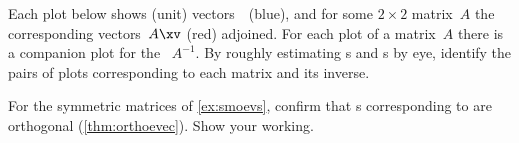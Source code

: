 \begin{exercise}  
Each plot below shows (unit) vectors~\xv\ (blue), and for some \(2\times 2\) matrix~\(A\) the corresponding vectors~\(A\xv\) (red) adjoined. 
For each plot of a matrix~\(A\) there is a companion plot for the ~\(A^{-1}\).
By roughly estimating s and s by eye, identify the pairs of plots corresponding to each matrix and its inverse.
\begin{Parts}
\item\label{ex:epria} 
\item\label{ex:eprib} 
\item\label{ex:epric} 
\item\label{ex:eprid} 
\begin{reduce}
\item\label{ex:eprie} 
\item\label{ex:eprif} 
\item\label{ex:eprig} 
\end{reduce}
\item\label{ex:eprih} 
\item\label{ex:eprii} 
\begin{reduce}
\item\label{ex:eprij} 
\end{reduce}
\end{Parts}
\end{exercise}





\begin{exercise}  
For the symmetric matrices of \autoref{ex:smoevs}, confirm that s corresponding to  are orthogonal (\autoref{thm:orthoevec}).  
Show your working.
\end{exercise}






